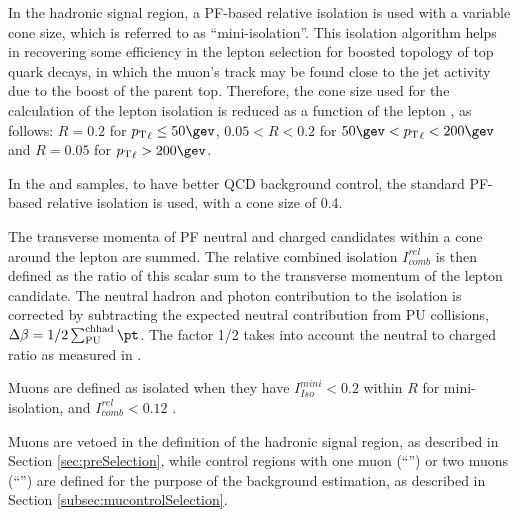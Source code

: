 In the hadronic signal region, a PF-based relative isolation is used with a variable cone size, which is referred to as ``mini-isolation''. 
This isolation algorithm helps in recovering some efficiency in the lepton selection for boosted topology of top quark decays, 
in which the muon's track may be found close to the jet activity due to the boost of the parent top. 
Therefore, the cone size used for the calculation of the lepton isolation is reduced as a function of 
the lepton \Pt, as follows: $R=0.2$ for $\Pt_{\ell}\leq50\gev$, $0.05<R<0.2$ for $50 \gev < \Pt_{\ell} < 200\gev$ and $R=0.05$ for $\Pt_{\ell} > 200 \gev$.

In the \mj and \mmj samples, to have better QCD background control, the standard PF-based relative isolation is used, with a cone size of 0.4.

The transverse momenta of PF neutral and charged candidates within a cone around the lepton are summed. 
The relative combined isolation $I^{rel}_{comb}$ is then defined as 
the ratio of this scalar sum to the transverse momentum of the lepton candidate. 
The neutral hadron and photon contribution to the isolation is corrected 
by subtracting the expected neutral contribution from PU collisions, $\Delta\beta=1/2\sum_{\mathrm{PU}}^{\mathrm{ch had}}{\pt}$. 
The factor 1/2 takes into account the neutral to charged ratio as measured in \cite{CMS-PFT-10-002}. 

Muons are defined as isolated when they have $I^{mini}_{Iso} < 0.2$ within $R$ for mini-isolation, and $I^{rel}_{comb} < 0.12$ .


Muons are vetoed in the definition of the hadronic signal region, 
as described in Section \ref{sec:preSelection}, while 
control regions with one muon (``\mj'') or two muons (``\mmj'') are defined for the purpose of the background estimation, 
as described in Section \ref{subsec:mucontrolSelection}.




